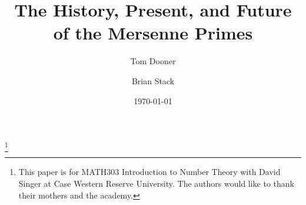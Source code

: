 \documentclass[]{amsart}
\theoremstyle{definition}
\begin{document}
\title{The History, Present, and Future of the Mersenne Primes}
\date{\today}


\thanks{This paper is for MATH303 Introduction to Number Theory with David Singer at Case Western Reserve University. The authors would like to thank their mothers and the academy.}

\author{Tom Dooner}
\address{Case Western Reserve University, 
Cleveland, OH 44106}

\author{Brian Stack}

\maketitle








\end{document}
